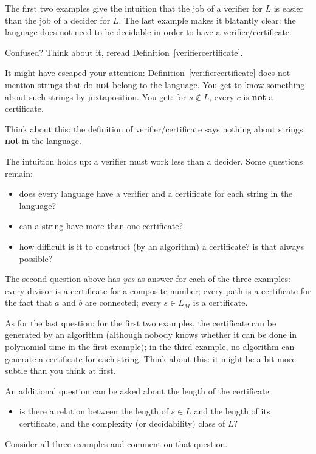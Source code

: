 The first two examples give the intuition that the job of a verifier
for $L$ is easier than the job of a decider for $L$. The last example
makes it blatantly clear: the language does not need to be decidable
in order to have a verifier/certificate.

Confused? Think about it, reread Definition~\ref{verifiercertificate}.

It might have escaped your attention:
Definition~\ref{verifiercertificate} does not mention strings that do
{\bf not} belong to the language. You get to know something about such
strings by juxtaposition. You get: for $s \notin L$, every $c$ is {\bf
not} a certificate.

Think about this: the definition of verifier/certificate says nothing
about strings {\bf not} in the language.

The intuition holds up: a verifier must work less than a decider. Some
questions remain:
\begin{itemize}
\item 
does every language have a verifier and a certificate for each string
in the language?
\item
can a string have more than one certificate?
\item 
how difficult is it to construct (by an algorithm) a certificate? is
that always possible?
\end{itemize}

The second question above has {\em yes} as answer for each of the
three examples: every divisor is a certificate for a composite number;
every path is a certificate for the fact that $a$ and $b$ are
connected; every $s \in L_M$ is a certificate.

As for the last question: for the first two examples, the certificate
can be generated by an algorithm (although nobody knows whether it can
be done in polynomial time in the first example); in the third
example, no algorithm can generate a certificate for each
string. Think about this: it might be a bit more subtle than you think
at first.

An additional question can be asked about the length of the certificate:
\begin{itemize}
\item 
is there a relation between the length of $s \in L$ and the length of
its certificate, and the complexity (or decidability) class of $L$?
\end{itemize}
Consider all three examples and comment on that question.



